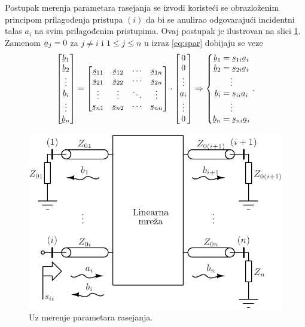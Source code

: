 \documentclass[a4paper, 12pt, diplomski]{etf}
\newcommand{\faz}[1]{\underaccent{\bar}{#1}}
\begin{document}
Postupak merenja parametara 
rasejanja
se izvodi koristeći se obrazloženim principom prilagođenja pristupa $(i)$ da bi se
anulirao odgovarajući incidentni talas $a_i$
na svim prilagođenim pristupima. Ovaj postupak je
ilustrovan na slici \ref{fig:nport_measure}. Zamenom 
$\faz a_j = 0$ za $j \neq i$ i 
$1 \leq j \leq n$
u izraz \eqref{eq:spar} dobijaju se veze
\begin{equation}
\begin{bmatrix}
\faz b_1\\ 
\faz b_2\\ 
\vdots \\ 
\faz b_i \\
\vdots \\
\faz b_n
\end{bmatrix}
=
\begin{bmatrix}
\faz s_{11} & \faz s_{12} & \cdots & \faz s_{1n}\\ 
\faz s_{21} & \faz s_{22} & \cdots & \faz s_{2n} \\
\vdots & \vdots & \ddots & \vdots \\ 
\faz s_{n1} & \faz s_{n2} & \cdots & \faz s_{nn}
\end{bmatrix} 
\cdot
\begin{bmatrix}
0\\ 
0\\ 
\vdots \\ 
\faz a_i \\
\vdots \\
0
\end{bmatrix}
\Rightarrow
\left\{\begin{matrix}
\faz b_1 = \faz s_{1i} \faz a_i \\
\faz b_2 = \faz s_{2i} \faz a_i \\
\vdots \\
\faz b_i = \faz s_{ii} \faz a_i \\
\vdots \\
\faz b_n = \faz s_{ni} \faz a_i \\
\end{matrix}\right. .
\label{eq:spar_meas}
\end{equation}
%
\begin{figure}[b!]
    \centering
    \includegraphics{fig/nport_measure.pdf}
    \caption{Uz merenje parametara rasejanja.}
    \label{fig:nport_measure}
\end{figure}
\end{document}
